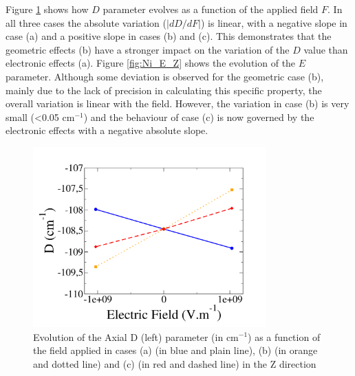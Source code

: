 \documentclass[10pt]{report}
\numberwithin{equation}{section}
\begin{document}

Figure \ref{fig:Ni_D_Z} shows how $D$ parameter evolves as a function of the applied field $F$.
In all three cases the absolute variation ($|dD/dF|$) is linear, with a negative slope in case (a) and a positive slope in cases (b) and (c).
This demonstrates that the geometric effects (b) have a stronger impact on the variation of the $D$ value than electronic effects (a).
Figure \ref{fig:Ni_E_Z} shows the evolution of the $E$ parameter. Although some deviation is observed for the geometric case (b), mainly due to the lack of precision in calculating this specific property, the overall variation is linear with the field.
However, the variation in case (b) is very small (<0.05 cm$^{-1}$) and the behaviour of case (c) is now governed by the electronic effects with a negative absolute slope.

\begin{figure}[!h]
    \centering
    \includegraphics[width=0.8\textwidth]{Images/D_E_Z.png}
    \caption{Evolution of the Axial D (left) parameter (in cm$^{-1}$) as a function of the field applied in cases (a) (in blue and plain line), (b) (in orange and dotted line) and (c) (in red and dashed line) in the Z direction}
    \label{fig:Ni_D_Z}
\end{figure}
\end{document}
